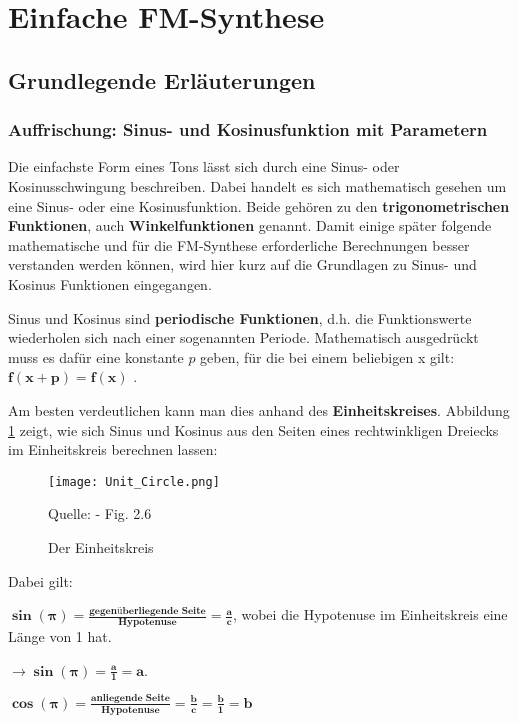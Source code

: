 \section{Einfache FM-Synthese}
\label{einfacheFM}
\FloatBarrier
\subsection{Grundlegende Erläuterungen}
\subsubsection{Auffrischung: Sinus- und Kosinusfunktion mit Parametern}
Die einfachste Form eines Tons lässt sich durch eine Sinus- oder Kosinusschwingung beschreiben. Dabei handelt es sich mathematisch gesehen um eine Sinus- oder eine Kosinusfunktion. Beide gehören zu den \textbf{trigonometrischen Funktionen}, auch \textbf{Winkelfunktionen} genannt. Damit einige später folgende mathematische und für die FM-Synthese erforderliche Berechnungen besser verstanden werden können, wird hier kurz auf die Grundlagen zu Sinus- und Kosinus Funktionen eingegangen. 

Sinus und Kosinus sind \textbf{periodische Funktionen}, d.h. die Funktionswerte wiederholen sich nach einer sogenannten Periode. Mathematisch ausgedrückt muss es dafür eine konstante $p$  geben, für die bei einem beliebigen x gilt: $\bm{f(x + p) =  f(x)}$ .

Am besten verdeutlichen kann man dies anhand des \textbf{Einheitskreises}. Abbildung \ref{fig:unitcircle} zeigt, wie sich Sinus und Kosinus aus den Seiten eines rechtwinkligen Dreiecks im Einheitskreis berechnen lassen:

\begin{figure} [ht]
\centering
\texttt{[image: Unit\_Circle.png]}
\caption{Der Einheitskreis}
\label{fig:unitcircle}
Quelle: \cite{fmtheory} - Fig. 2.6
\end{figure}

Dabei gilt: 

$\bm{\sin(\pmb{\pi}) = \frac{\textbf{gegenüberliegende Seite}}{\textbf{Hypotenuse}} = \frac{a}{c}}$, wobei die Hypotenuse im Einheitskreis eine Länge von 1 hat. 

$\bm{\to\sin(\pmb{\pi}) = \frac{a}{1} = a}$.

$\bm{\cos(\pmb{\pi}) = \frac{\textbf{anliegende Seite}}{\textbf{Hypotenuse}} = \frac{b}{c} = \frac{b}{1} = b}$ \cite[s. 22 - 27]{fmtheory} \\

